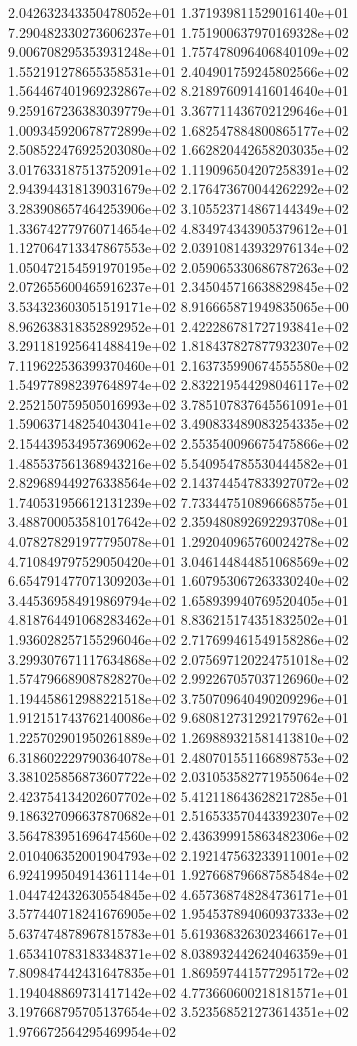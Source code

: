 2.042632343350478052e+01 1.371939811529016140e+01 7.290482330273606237e+01
1.751900637970169328e+02 9.006708295353931248e+01 1.757478096406840109e+02
1.552191278655358531e+01 2.404901759245802566e+02 1.564467401969232867e+02
8.218976091416014640e+01 9.259167236383039779e+01 3.367711436702129646e+01
1.009345920678772899e+02 1.682547884800865177e+02 2.508522476925203080e+02
1.662820442658203035e+02 3.017633187513752091e+02 1.119096504207258391e+02
2.943944318139031679e+02 2.176473670044262292e+02 3.283908657464253906e+02
3.105523714867144349e+02 1.336742779760714654e+02 4.834974343905379612e+01
1.127064713347867553e+02 2.039108143932976134e+02 1.050472154591970195e+02
2.059065330686787263e+02 2.072655600465916237e+01 2.345045716638829845e+02
3.534323603051519171e+02 8.916665871949835065e+00 8.962638318352892952e+01
2.422286781727193841e+02 3.291181925641488419e+02 1.818437827877932307e+02
7.119622536399370460e+01 2.163735990674555580e+02 1.549778982397648974e+02
2.832219544298046117e+02 2.252150759505016993e+02 3.785107837645561091e+01
1.590637148254043041e+02 3.490833489083254335e+02 2.154439534957369062e+02
2.553540096675475866e+02 1.485537561368943216e+02 5.540954785530444582e+01
2.829689449276338564e+02 2.143744547833927072e+02 1.740531956612131239e+02
7.733447510896668575e+01 3.488700053581017642e+02 2.359480892692293708e+01
4.078278291977795078e+01 1.292040965760024278e+02 4.710849797529050420e+01
3.046144844851068569e+02 6.654791477071309203e+01 1.607953067263330240e+02
3.445369584919869794e+02 1.658939940769520405e+01 4.818764491068283462e+01
8.836215174351832502e+01 1.936028257155296046e+02 2.717699461549158286e+02
3.299307671117634868e+02 2.075697120224751018e+02 1.574796689087828270e+02
2.992267057037126960e+02 1.194458612988221518e+02 3.750709640490209296e+01
1.912151743762140086e+02 9.680812731292179762e+01 1.225702901950261889e+02
1.269889321581413810e+02 6.318602229790364078e+01 2.480701551166898753e+02
3.381025856873607722e+02 2.031053582771955064e+02 2.423754134202607702e+02
5.412118643628217285e+01 9.186327096637870682e+01 2.516533570443392307e+02
3.564783951696474560e+02 2.436399915863482306e+02 2.010406352001904793e+02
2.192147563233911001e+02 6.924199504914361114e+01 1.927668796687585484e+02
1.044742432630554845e+02 4.657368748284736171e+01 3.577440718241676905e+02
1.954537894060937333e+02 5.637474878967815783e+01 5.619368326302346617e+01
1.653410783183348371e+02 8.038932442624046359e+01 7.809847442431647835e+01
1.869597441577295172e+02 1.194048869731417142e+02 4.773660600218181571e+01
3.197668795705137654e+02 3.523568521273614351e+02 1.976672564295469954e+02

